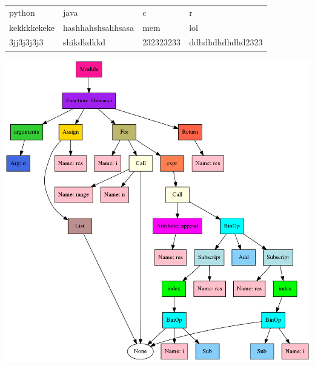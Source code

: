 \documentclass{article}
\begin{document}
\begin{center}\begin{tabular}{llll}
python&java&c&r\\
kekkkkekeke&hashhahshsahhsasa&mem&lol\\
3jj3j3j3j3&shikdkdkkd&232323233&ddhdhdhdhdhd2323
\end{tabular}
\includegraphics[width=\textwidth]{artifacts/ast.png}
\end{center}
\end{document}
